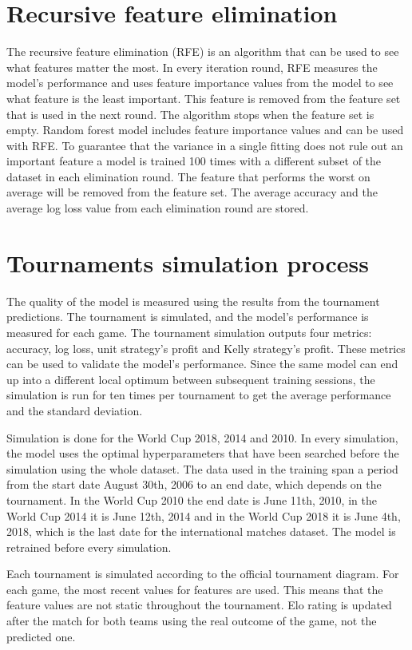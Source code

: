 \section{Recursive feature elimination}
The recursive feature elimination (RFE) is an algorithm that can be used to see what features matter the most. In every iteration round, RFE measures the model's performance and uses feature importance values from the model to see what feature is the least important. This feature is removed from the feature set that is used in the next round. The algorithm stops when the feature set is empty. \cite{granitto2006recursive} Random forest model includes feature importance values and can be used with RFE. To guarantee that the variance in a single fitting does not rule out an important feature a model is trained 100 times with a different subset of the dataset in each elimination round. The feature that performs the worst on average will be removed from the feature set. The average accuracy and the average log loss value from each elimination round are stored.

\section{Tournaments simulation process}
The quality of the model is measured using the results from the tournament predictions. The tournament is simulated, and the model's performance is measured for each game. The tournament simulation outputs four metrics: accuracy, log loss, unit strategy's profit and Kelly strategy's profit. These metrics can be used to validate the model's performance. Since the same model can end up into a different local optimum between subsequent training sessions, the simulation is run for ten times per tournament to get the average performance and the standard deviation.

Simulation is done for the World Cup 2018, 2014 and 2010. In every simulation, the model uses the optimal hyperparameters that have been searched before the simulation using the whole dataset. The data used in the training span a period from the start date August 30th, 2006 to an end date, which depends on the tournament. In the World Cup 2010 the end date is June 11th, 2010, in the World Cup 2014 it is June 12th, 2014 and in the World Cup 2018 it is June 4th, 2018, which is the last date for the international matches dataset. The model is retrained before every simulation.

Each tournament is simulated according to the official tournament diagram. For each game, the most recent values for features are used. This means that the feature values are not static throughout the tournament. Elo rating is updated after the match for both teams using the real outcome of the game, not the predicted one.

